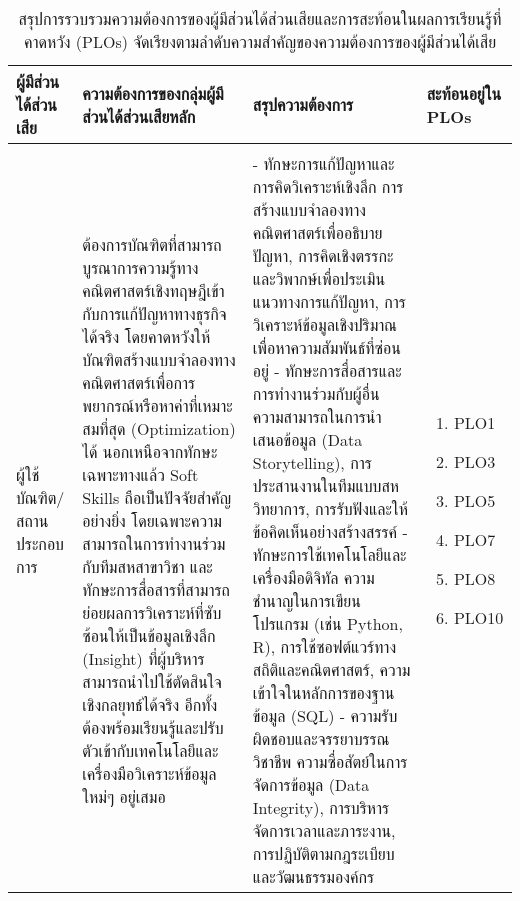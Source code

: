 \begin{longtable}{| >{\raggedright}p{} | >{\raggedright}p{} | >{\raggedright}p{} | >{\centering\arraybackslash}p{} |}
    \caption{สรุปการรวบรวมความต้องการของผู้มีส่วนได้ส่วนเสียและการสะท้อนในผลการเรียนรู้ที่คาดหวัง (PLOs) จัดเรียงตามลำดับความสำคัญของความต้องการของผู้มีส่วนได้เสีย}
    \label{table:stakeholder_summary}
    \\
    \hline
    \textbf{ผู้มีส่วนได้ส่วนเสีย} & \textbf{ความต้องการของกลุ่มผู้มีส่วนได้ส่วนเสียหลัก} & \textbf{สรุปความต้องการ} & \textbf{สะท้อนอยู่ใน PLOs} \\
    \hline
    \endhead
    \multicolumn{4}{|l|}{\textbf{ผู้มีส่วนได้ส่วนเสียภายนอก (External Stakeholders)}} \\
    \hline
    ผู้ใช้บัณฑิต/สถานประกอบการ & 
ต้องการบัณฑิตที่สามารถบูรณาการความรู้ทางคณิตศาสตร์เชิงทฤษฎีเข้ากับการแก้ปัญหาทางธุรกิจได้จริง โดยคาดหวังให้บัณฑิตสร้างแบบจำลองทางคณิตศาสตร์เพื่อการพยากรณ์หรือหาค่าที่เหมาะสมที่สุด (Optimization) ได้ นอกเหนือจากทักษะเฉพาะทางแล้ว Soft Skills ถือเป็นปัจจัยสำคัญอย่างยิ่ง โดยเฉพาะความสามารถในการทำงานร่วมกับทีมสหสาขาวิชา และทักษะการสื่อสารที่สามารถย่อยผลการวิเคราะห์ที่ซับซ้อนให้เป็นข้อมูลเชิงลึก (Insight) ที่ผู้บริหารสามารถนำไปใช้ตัดสินใจเชิงกลยุทธ์ได้จริง อีกทั้งต้องพร้อมเรียนรู้และปรับตัวเข้ากับเทคโนโลยีและเครื่องมือวิเคราะห์ข้อมูลใหม่ๆ อยู่เสมอ &
- ทักษะการแก้ปัญหาและการคิดวิเคราะห์เชิงลึก การสร้างแบบจำลองทางคณิตศาสตร์เพื่ออธิบายปัญหา, การคิดเชิงตรรกะและวิพากษ์เพื่อประเมินแนวทางการแก้ปัญหา, การวิเคราะห์ข้อมูลเชิงปริมาณเพื่อหาความสัมพันธ์ที่ซ่อนอยู่ \newline
- ทักษะการสื่อสารและการทำงานร่วมกับผู้อื่น ความสามารถในการนำเสนอข้อมูล (Data Storytelling), การประสานงานในทีมแบบสหวิทยาการ, การรับฟังและให้ข้อคิดเห็นอย่างสร้างสรรค์ \newline
- ทักษะการใช้เทคโนโลยีและเครื่องมือดิจิทัล ความชำนาญในการเขียนโปรแกรม (เช่น Python, R), การใช้ซอฟต์แวร์ทางสถิติและคณิตศาสตร์, ความเข้าใจในหลักการของฐานข้อมูล (SQL) \newline
- ความรับผิดชอบและจรรยาบรรณวิชาชีพ ความซื่อสัตย์ในการจัดการข้อมูล (Data Integrity), การบริหารจัดการเวลาและภาระงาน, การปฏิบัติตามกฎระเบียบและวัฒนธรรมองค์กร &
\begin{enumerate}[label={}]
	\item PLO1
	\item PLO3
	\item PLO5
	\item PLO7
	\item PLO8
	\item PLO10

\end{enumerate}
\end{longtable}
